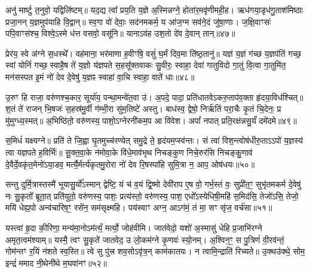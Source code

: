 अनु॑ मार्ष्टु त॒नुवो॒ यद्विलि॑ष्टम्॥ यद॒द्य त्वा᳚ प्रय॒ति य॒ज्ञे अ॒स्मिन्नग्ने॒ होता॑र॒मवृ॑णीमही॒ह। ऋध॑गया॒डृध॑गु॒ताश॑मिष्ठाः प्रजा॒नन् य॒ज्ञमुप॑याहि वि॒द्वान्॥ स्व॒गा वो॑ देवाः॒ सद॑नमकर्म॒ य आ॑ज॒ग्म सव॑ने॒दं जु॑षा॒णाः। ज॒क्षि॒वाꣳसः॑ पपि॒वाꣳस॑श्च॒ विश्वे॒\-ऽस्मे ध॑त्त वसवो॒ वसू॑नि॥ याना\-ऽव॑ह उश॒तो दे॑व दे॒वान् तान्॥४७॥

प्रेर॑य॒ स्वे अ॑ग्ने स॒धस्थे᳚। वह॑माना॒ भर॑माणा ह॒वीꣳषि॒ वसुं॑ घ॒र्मं दिव॒मा ति॑ष्ठ॒तानु॑॥ यज्ञ॑ य॒ज्ञं ग॑च्छ य॒ज्ञप॑तिं गच्छ॒ स्वां योनिं॑ गच्छ॒ स्वाहै॒ष ते॑ य॒ज्ञो य॑ज्ञपते स॒हसू᳚क्तवाकः सु॒वीरः॒ स्वाहा॒ देवा॑ गातुविदो गा॒तुं वि॒त्वा गा॒तुमि॑त॒ मन॑सस्पत इ॒मं नो॑ देव दे॒वेषु॑ य॒ज्ञꣴ स्वाहा॑ वा॒चि स्वाहा॒ वाते॑ धाः॥४८॥

{\anuvakamend[{कृ॒णो॒तु॒ तान॒ष्टाच॑त्वारिꣳशच्च॥44 (38)॥}]}

उ॒रुꣳ हि राजा॒ वरु॑णश्च॒कार॒ सूर्या॑य॒ पन्था॒मन्वे॑त॒वा उ॑। अ॒पदे॒ पादा॒ प्रति॑धातवे\-ऽकरु॒ताप॑व॒क्ता हृ॑दया॒विध॑श्चित्॥ श॒तं ते॑ राजन् भि॒षजः॑ स॒हस्र॑मु॒र्वी ग॑म्भी॒रा सु॑म॒तिष्टे॑ अस्तु। बाध॑स्व॒ द्वेषो॒ निर्\mbox{}ऋ॑तिं परा॒चैः कृ॒तं चि॒देनः॒ प्र मु॑मुग्ध्य॒स्मत्॥ अ॒भिष्ठि॑तो॒ वरु॑णस्य॒ पाशो॒\-ऽग्नेरनी॑कम॒प आ वि॑वेश। अपां᳚ नपात् प्रति॒रक्ष॑न्नसु॒र्यं॑ दमे॑दमे॥४९॥

स॒मिधं॑ यक्ष्यग्ने॥ प्रति॑ ते जि॒ह्वा घृ॒तमुच्च॑रण्येत् समु॒द्रे ते॒ हृद॑यम॒प्स्व॑न्तः। सं त्वा॑ विश॒न्त्वोष॑धीरु॒ता\-ऽ\-ऽपो॑ य॒ज्ञस्य॑ त्वा यज्ञपते ह॒विर्भिः॑॥ सू॒क्त॒वा॒के न॑मोवा॒के वि॑धे॒माव॑भृथ निचङ्कुण निचे॒रुर॑सि निचङ्कु॒णाव॑ दे॒वैर्दे॒वकृ॑त॒मेनो॑\-ऽया॒डव॒ मर्त्यै॒र्मर्त्य॑कृतमु॒रोरा नो॑ देव रि॒षस्पा॑हि सुमि॒त्रा न॒ आप॒ ओष॑धयः॥५०॥

सन्तु दुर्मि॒त्रास्तस्मै॑ भूयासु॒र्यो᳚\-ऽस्मान् द्वेष्टि॒ यं च॑ व॒यं द्वि॒ष्मो देवी॑राप ए॒ष वो॒ गर्भ॒स्तं वः॒ सुप्री॑त॒ꣳ॒ सुभृ॑तमकर्म दे॒वेषु॑ नः सु॒कृतो᳚ ब्रूता॒त् प्रति॑युतो॒ वरु॑णस्य॒ पाशः॒ प्रत्य॑स्तो॒ वरु॑णस्य॒ पाश॒ एधो᳚\-ऽस्येधिषी॒महि॑ स॒मिद॑सि॒ तेजो॑\-ऽसि॒ तेजो॒ मयि॑ धेह्य॒पो अन्व॑चारिष॒ꣳ॒ रसे॑न॒ सम॑सृक्ष्महि। पय॑स्वाꣳ अग्न॒ आ\-ऽग॑मं॒ तं मा॒ सꣳ सृ॑ज॒ वर्च॑सा॥५१॥

{\anuvakamend[{दमे॑दम॒ ओष॑धय॒ आ षट् च॑॥45 (39)॥}]}

यस्त्वा॑ हृ॒दा की॒रिणा॒ मन्य॑मा॒नो\-ऽम॑र्त्यं॒ मर्त्यो॒ जोह॑वीमि। जात॑वेदो॒ यशो॑ अ॒स्मासु॑ धेहि प्र॒जाभि॑रग्ने अमृत॒त्वम॑श्याम्॥ यस्मै॒ त्वꣳ सु॒कृते॑ जातवेद॒ उ लो॒कम॑ग्ने कृ॒णवः॑ स्यो॒नम्। अ॒श्विन॒ꣳ॒ स पु॒त्रिणं॑ वी॒रव॑न्तं॒ गोम॑न्तꣳ र॒यिं न॑शते स्व॒स्ति॥ त्वे सु पु॑त्त्र शव॒सो\-ऽवृ॑त्र॒न् काम॑कातयः। न त्वामि॒न्द्राति॑ रिच्यते॥ उ॒क्थउ॑क्थे॒ सोम॒ इन्द्रं॑ ममाद नी॒थेनी॑थे म॒घवा॑नꣳ॥५२॥

